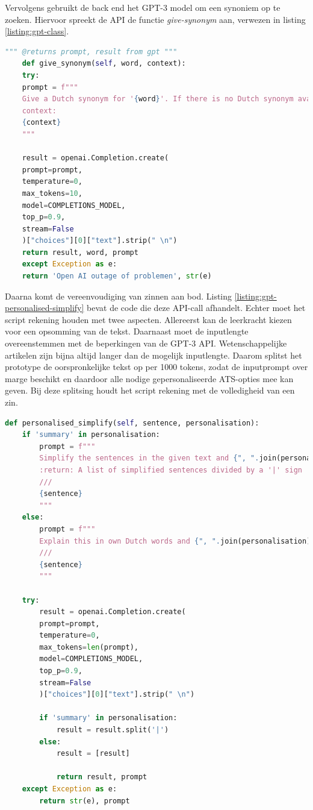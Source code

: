 Vervolgens gebruikt de back end het GPT-3 model om een synoniem op te zoeken. Hiervoor spreekt de API de functie \textit{give-synonym} aan, verwezen in listing \ref{listing:gpt-class}.

\begin{lstlisting}[language=Python, caption={Een synoniem genereren of ophalen met GPT-3.}, label={listing:gpt-give-synonym}]
	""" @returns prompt, result from gpt """
	def give_synonym(self, word, context):
	try:
	prompt = f"""
	Give a Dutch synonym for '{word}'. If there is no Dutch synonym available, explain it between curly brackets.
	context:
	{context}
	"""
	
	result = openai.Completion.create(
	prompt=prompt,
	temperature=0,
	max_tokens=10,
	model=COMPLETIONS_MODEL,
	top_p=0.9,
	stream=False
	)["choices"][0]["text"].strip(" \n")    
	return result, word, prompt
	except Exception as e:
	return 'Open AI outage of problemen', str(e)
\end{lstlisting}
	
Daarna komt de vereenvoudiging van zinnen aan bod. Listing \ref{listing:gpt-personalised-simplify} bevat de code die deze API-call afhandelt. Echter moet het script rekening houden met twee aspecten. Allereerst kan de leerkracht kiezen voor een opsomming van de tekst. Daarnaast moet de inputlengte overeenstemmen met de beperkingen van de GPT-3 API. Wetenschappelijke artikelen zijn bijna altijd langer dan de mogelijk inputlengte. Daarom splitst het prototype de oorspronkelijke tekst op per 1000 tokens, zodat de inputprompt over marge beschikt en daardoor alle nodige gepersonaliseerde ATS-opties mee kan geven. Bij deze splitsing houdt het script rekening met de volledigheid van een zin. 
	
\begin{lstlisting}[language=Python, caption={Een zin gepersonaliseerd vereenvoudigen met GPT-3.}, label={listing:gpt-personalised-simplify}]
def personalised_simplify(self, sentence, personalisation):
	if 'summary' in personalisation:
		prompt = f"""
		Simplify the sentences in the given text and {", ".join(personalisation)}
		:return: A list of simplified sentences divided by a '|' sign
		///
		{sentence}
		"""
	else:
		prompt = f"""
		Explain this in own Dutch words and {", ".join(personalisation)}
		///
		{sentence}
		"""
	
	try:
		result = openai.Completion.create(
		prompt=prompt,
		temperature=0,
		max_tokens=len(prompt),
		model=COMPLETIONS_MODEL,
		top_p=0.9,
		stream=False
		)["choices"][0]["text"].strip(" \n")
		
		if 'summary' in personalisation:
			result = result.split('|')
		else:
			result = [result]
			
			return result, prompt
	except Exception as e:
		return str(e), prompt 
\end{lstlisting}


